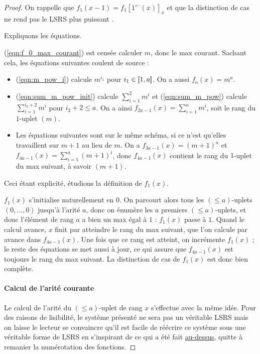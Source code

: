 \documentclass{report}
\newcommand{\eqpred}[3]{#1\left[ #2^{\leftarrow}(#3) \right]_{#3}}
\newcommand{\leqa}{\left( \leqslant a \right)}
\begin{document}
\begin{proof}
			On rappelle que $f_1(x-1) = \eqpred{f_1}{1}{x}$ et que la distinction de cas ne rend pas le LSRS plus puissant \cite{GrandjeanSchwentick2002}. 
			
			Expliquons les équations.
			
			(\ref{eqn:f_0_max_courant}) est censée calculer $m$, donc le max courant. Sachant cela, les équations suivantes coulent de source : 
			
			\begin{itemize}
				\item 	(\ref{eqn:m_pow_i}) calcule $m^{i_1}$ pour $i_1 \in \left[\!\!\>\!\left[ 1 , a \right]\!\!\>\!\right]$. On a aussi $f_{a}(x) = m^a$. 
				
				\item 	(\ref{eqn:sum_m_pow_init}) calcule $\sum_{i = 1}^{2} m^i$ et (\ref{eqn:sum_m_pow}) calcule $\sum_{i = 1}^{i_2+2} m^i$ pour $i_2+2 \leqslant a$. On a ainsi $f_{2a-1}(x) = \sum_{i = 1}^{a} m^i$, soit le rang du $1$-uplet $(m)$.
				
				\item 	Les équations suivantes sont sur le même schéma, si ce n'est qu'elles travaillent sur $m+1$ au lieu de $m$. On a $f_{3a-1}(x) = (m+1)^a$ et $f_{4a-1}(x) = \sum_{i = 1}^{a} (m+1)^i$, donc $f_{4a-1}(x)$ contient le rang du $1$-uplet du max suivant, à savoir $(m+1)$. 
			\end{itemize}
			
			Ceci étant explicité, étudions la définition de $f_1(x)$. 
			
			$f_1(x)$ s'initialise naturellement en $0$. On parcourt alors tous les $\leqa$-uplets $(0, \dots, 0)$ jusqu'à l'arité $a$, donc on énumère les $a$ premiers $\leqa$-uplets, et donc l'élément de rang $a$ a bien un max égal à $1$ : $f_1(x)$ passe à $1$. Quand le calcul avance, $x$ finit par atteindre le rang du max suivant, que l'on calcule par avance dans $f_{4a-1}(x)$. Une fois que ce rang est atteint, on incrémente $f_1(x)$ ; le reste des équations se met aussi à jour, ce qui assure que $f_{4a-1}(x)$ est toujours le rang du max suivant. La distinction de cas de $f_1(x)$ est donc bien complète.
			
		\paragraph{Calcul de l'arité courante}
			\label{par:calcul_arite_courante}
			Le calcul de l'arité du $\leqa$-uplet de rang $x$ s'effectue avec la même idée. Pour des raisons de lisibilité, le système présenté ne sera pas un véritable LSRS mais on laisse le lecteur se convaincre qu'il est facile de réécrire ce système sous une véritable forme de LSRS en s'inspirant de ce qui a été fait \hyperref[par:calcul_max_bon_ordre]{au-dessus}, quitte à remanier la numérotation des fonctions. 
			

\end{proof}
\end{document}
